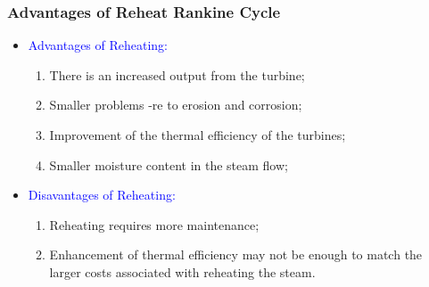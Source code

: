 \documentclass[10pt,compress]{beamer}
\begin{document}
\begin{frame}
 \frametitle{Advantages of Reheat Rankine Cycle}
 \begin{itemize}
  \item <1->\textcolor{blue}{Advantages of Reheating:}
   \begin{enumerate}
    \item <2-> There is an increased output from the turbine;
    \item <3-> Smaller problems -re to erosion and corrosion;
    \item <4-> Improvement of the thermal efficiency of the turbines;
    \item <5-> Smaller moisture content in the steam flow;
   \end{enumerate}
  \item <6->\textcolor{blue}{Disavantages of Reheating:}
   \begin{enumerate}
    \item <7-> Reheating requires more maintenance;
    \item <8-> Enhancement of thermal efficiency may not be enough to match the larger costs associated with reheating the steam.
   \end{enumerate}
 \end{itemize}
\end{frame}
\end{document}
